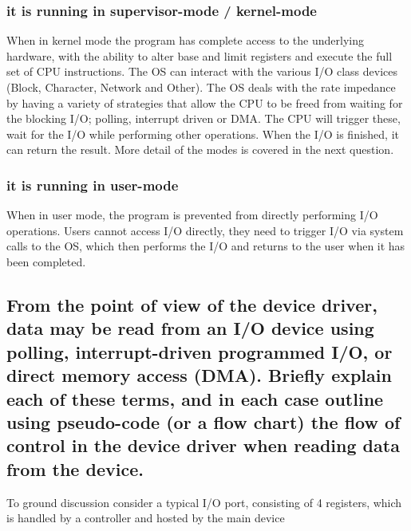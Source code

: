 \documentclass[]{article}
\begin{document}
        \subsubsection{it is running in supervisor-mode / kernel-mode}

            When in kernel mode the program has complete access to the underlying hardware, with the ability to alter base and limit registers and execute the full set of CPU instructions. The OS can interact with the various I/O class devices (Block, Character, Network and Other). The OS deals with the rate impedance by having a variety of strategies that allow the CPU to be freed from waiting for the blocking I/O; polling, interrupt driven or DMA. The CPU will trigger these, wait for the I/O while performing other operations. When the I/O is finished, it can return the result. More detail of the modes is covered in the next question.

        \subsubsection{it is running in user-mode}

            When in user mode, the program is prevented from directly performing I/O operations. Users cannot access I/O directly, they need to trigger I/O via system calls to the OS, which then performs the I/O and returns to the user when it has been completed.

    \subsection{From the point of view of the device driver, data may be read from an I/O device using polling, interrupt-driven programmed I/O, or direct memory access (DMA). Briefly explain each of these terms, and in each case outline using pseudo-code (or a flow chart) the flow of control in the device driver when reading data from the device.}

        To ground discussion consider a typical I/O port, consisting of 4 registers, which is handled by a controller and hosted by the main device
\end{document}
